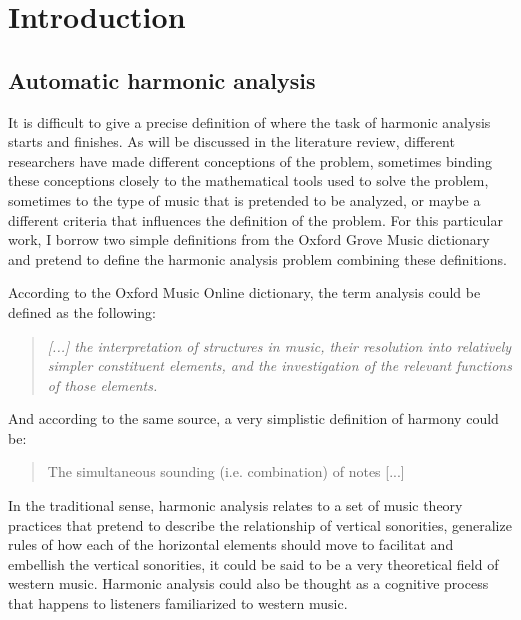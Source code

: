 \chapter{Introduction}

\section{Automatic harmonic analysis}
It is difficult to give a precise definition of where the task of harmonic analysis starts and finishes. As will be discussed in the literature review, different researchers have made different conceptions of the problem, sometimes binding these conceptions closely to the mathematical tools used to solve the problem, sometimes to the type of music that is pretended to be analyzed, or maybe a different criteria that influences the definition of the problem. For this particular work, I borrow two simple definitions from the Oxford Grove Music dictionary and pretend to define the harmonic analysis problem combining these definitions.

According to the Oxford Music Online dictionary, the term analysis could be defined as the following: \cite{oxfordanalysis}

\begin{quote}
\centering
\emph{[...] the interpretation of structures in music, \linebreak
their resolution into relatively simpler constituent elements, \linebreak and the investigation of the relevant functions of those elements.}
\end{quote}

And according to the same source, a very simplistic definition of harmony could be:
\cite{oxfordharmony}

\begin{quote}
\centering
The simultaneous sounding (i.e. combination) of notes [...]
\end{quote}

In the traditional sense, harmonic analysis relates to a set of music theory practices that pretend to describe the relationship of vertical sonorities, generalize rules of how each of the horizontal elements should move to facilitat and embellish the vertical sonorities, it could be said to be a very theoretical field of western music. Harmonic analysis could also be thought as a cognitive process that happens to listeners familiarized to western music.

